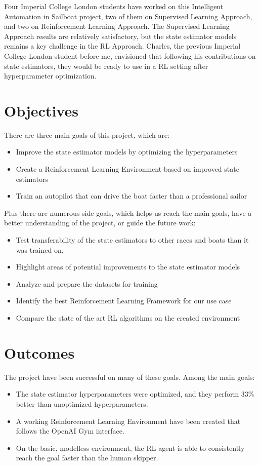 \documentclass[12pt,twoside]{report}
\begin{document}
Four Imperial College London students have worked on this Intelligent Automation in Sailboat project, two of them on Supervised Learning Approach, and two on Reinforcement Learning Approach. The Supervised Learning Approach results are relatively satisfactory, but the state estimator models remains a key challenge in the RL Approach. Charles, the previous Imperial College London student before me, envisioned that following his contributions on state estimators, they would be ready to use in a RL setting after hyperparameter optimization.

\section{Objectives}
There are three main goals of this project, which are:
\begin{itemize}
    \item Improve the state estimator models by optimizing the hyperparameters
    \item Create a Reinforcement Learning Environment based on improved state estimators
    \item Train an autopilot that can drive the boat faster than a professional sailor
\end{itemize}

\bigskip
\noindent    
Plus there are numerous side goals, which helps us reach the main goals, have a better understanding of the project, or guide the future work:
\begin{itemize}
    \item Test transferability of the state estimators to other races and boats than it was trained on.
    \item Highlight areas of potential improvements to the state estimator models
    \item Analyze and prepare the datasets for training
    \item Identify the best Reinforcement Learning Framework for our use case
    \item Compare the state of the art RL algorithms on the created environment
\end{itemize}
    

\section{Outcomes} \label{sec:outcomes}
The project have been successful on many of these goals. Among the main goals:
\begin{itemize}
    \item The state estimator hyperparameters were optimized, and they perform 33\% better than unoptimized hyperparameters.
    \item A working Reinforcement Learning Environment have been created that follows the OpenAI Gym interface.
    \item On the basic, modelless environment, the RL agent is able to consistently reach the goal faster than the human skipper.
\end{itemize}
\end{document}
